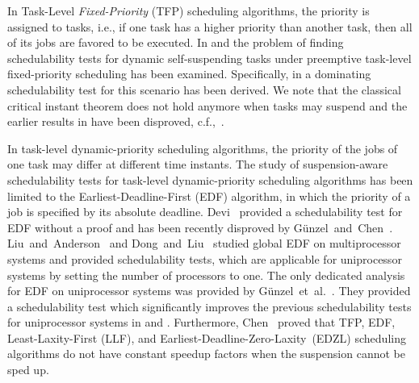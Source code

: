 \documentclass[conference]{IEEEtran}
\theoremstyle{definition}
\theoremstyle{remark}
\begin{document}
	In Task-Level \emph{Fixed-Priority} (TFP) scheduling algorithms, the priority is assigned to tasks, i.e., if one task has a higher priority than another task, then all of its jobs are favored to be executed.
	In \cite{huangpass:dac2015,ChenECRTS2016-suspension,RTCSA-KimCPKH95,ECRTS-AudsleyB04} and \cite[Page 162]{Liu:2000:RS:518501} the problem of finding schedulability tests for dynamic self-suspending tasks under preemptive task-level fixed-priority scheduling has been examined.
	Specifically, in \cite{ChenECRTS2016-suspension} a dominating schedulability test for this scenario has been derived. We note that the classical critical instant theorem does not hold anymore when tasks may suspend and the earlier results in \cite{RTCSA-KimCPKH95,ECRTS-AudsleyB04} have been disproved, c.f.,~\cite{suspension-review-jj}.

	In task-level dynamic-priority scheduling algorithms, the priority of the jobs of one task may differ at different time instants. The study of suspension-aware schedulability tests for task-level dynamic-priority scheduling algorithms has been limited to the Earliest-Deadline-First (EDF) algorithm, in which the priority of a job is specified by its absolute deadline. Devi~\cite{DBLP:conf/ecrts/Devi03} provided a schedulability test for EDF without a proof and has been recently disproved by G\"unzel~and~Chen~\cite{DBLP:journals/rts/GunzelC20}. Liu~and~Anderson~\cite{DBLP:conf/ecrts/LiuA13} and Dong~and~Liu~\cite{DBLP:conf/rtss/DongL16}  studied  global EDF on multiprocessor systems and provided schedulability tests, which are applicable for uniprocessor systems by setting the number of processors to one.  The only dedicated analysis for EDF on uniprocessor systems was provided by G\"unzel~et~al.~\cite{guenzel2020sched_test_edf}. They  provided a schedulability test which significantly improves the previous schedulability tests for uniprocessor systems in \cite{DBLP:conf/ecrts/LiuA13} and \cite{DBLP:conf/rtss/DongL16}. Furthermore, Chen~\cite{RTSS2016-suspension} proved that TFP, EDF, Least-Laxity-First (LLF), and Earliest-Deadline-Zero-Laxity~(EDZL) scheduling algorithms do not have constant speedup factors when the suspension cannot be sped up.
	
\end{document}
